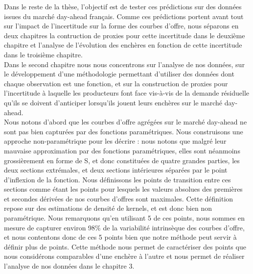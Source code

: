 Dans le reste de la thèse, l'objectif est de tester ces prédictions sur des données issues du marché day-ahead français. Comme ces prédictions portent avant tout sur l'impact de l'incertitude sur la forme des courbes d'offre, nous séparons en deux chapitres la contruction de proxies pour cette incertitude dans le deuxième chapitre et l'analyse de l'évolution des enchères en fonction de cette incertitude dans le troisième chapitre.\\

Dans le second chapitre nous nous concentrons sur l'analyse de nos données, sur le développement d'une méthodologie permettant d'utiliser des données dont chaque observation est une fonction, et sur la construction de proxies pour l'incertitude à laquelle les producteurs font face vis-à-vis de la demande résiduelle qu'ils se doivent d'anticiper lorsqu'ils jouent leurs enchères sur le marché day-ahead.\\

Nous notons d'abord que les courbes d'offre agrégées sur le marché day-ahead ne sont pas bien capturées par des fonctions paramétriques. Nous construisons une approche non-paramétrique pour les décrire : nous notons que malgré leur mauvaise approximation par des fonctions paramétriques, elles sont néanmoins grossièrement en forme de S, et donc constituées de quatre grandes parties, les deux sections extrémales, et deux sections intérieures séparées par le point d'inflexion de la fonction. Nous définissons les points de transition entre ces sections comme étant les points pour lesquels les valeurs absolues des premières et secondes dérivées de nos courbes d'offres sont maximales. Cette définition repose sur des estimations de densité de kernels, et est donc bien non paramétrique. Nous remarquons qu'en utilisant 5 de ces points, nous sommes en mesure de capturer environ 98\% de la variabilité intrinsèque des courbes d'offre, et nous contentons donc de ces 5 points bien que notre méthode peut servir à définir plus de points. Cette méthode nous permet de caractériser des points que nous considérons comparables d'une enchère à l'autre et nous permet de réaliser l'analyse de nos données dans le chapitre 3.\\

